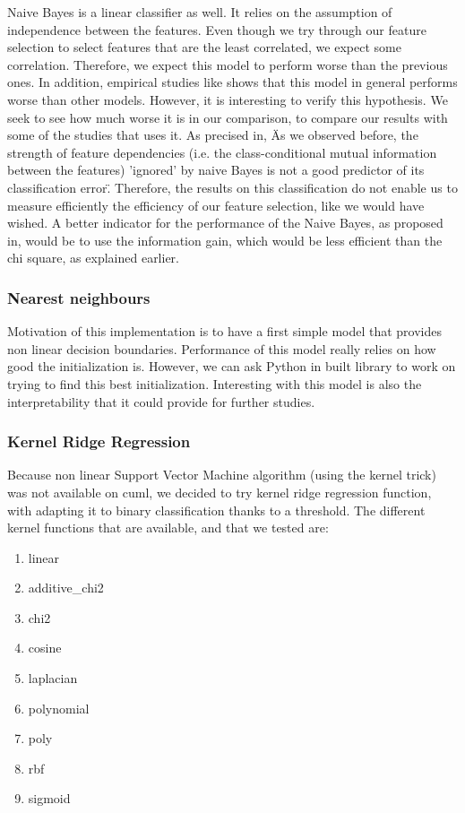 \documentclass{article}
\begin{document}
    Naive Bayes is a linear classifier as well.
    It relies on the assumption of independence between the features.
    Even though we try through our feature selection to select features that are the least correlated, we expect some correlation.
    Therefore, we expect this model to perform worse than the previous ones.
    In addition, empirical studies like\cite{MLmodelsComparison} shows that this model in general performs worse than other models.
    However, it is interesting to verify this hypothesis.
    We seek to see how much worse it is in our comparison, to compare our results with some of the studies that uses it.
    As precised in\cite{NaiveBayesBackground}, \"As we observed before, the strength of feature dependencies (i.e. the class-conditional mutual information between the features) ’ignored’ by naive Bayes is not a good predictor of its classification error\".
    Therefore, the results on this classification do not enable us to measure efficiently the efficiency of our feature selection, like we would have wished.
    A better indicator for the performance of the Naive Bayes, as proposed in\cite{NaiveBayesBackground}, would be to use the information gain, which would be less efficient than the chi square, as explained earlier. %

    \subsubsection{Nearest neighbours}

    Motivation of this implementation is to have a first simple model that provides non linear decision boundaries.
    Performance of this model really relies on how good the initialization is.
    However, we can ask Python in built library to work on trying to find this best initialization.
    Interesting with this model is also the interpretability that it could provide for further studies.

    \subsubsection{Kernel Ridge Regression}
    Because non linear Support Vector Machine algorithm (using the kernel trick) was not available on cuml, we decided to try kernel ridge regression function, with adapting it to binary classification thanks to a threshold.
    The different kernel functions that are available, and that we tested are:
    \begin{enumerate}
        \item linear
        \item additive\_chi2
        \item chi2
        \item cosine
        \item laplacian
        \item polynomial
        \item poly
        \item rbf
        \item sigmoid
    \end{enumerate}
\end{document}
